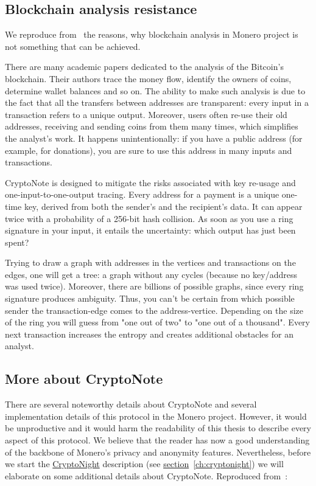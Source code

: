 \subsection{Blockchain analysis resistance}
We reproduce from~\cite{cryptonote} the reasons, why blockchain analysis in Monero project is not something that can be achieved.

There are many academic papers dedicated to the analysis of the Bitcoin's blockchain. Their authors trace the money flow, identify the owners of coins, determine wallet balances and so on. The ability to make such analysis is due to the fact that all the transfers between addresses are transparent: every input in a transaction refers to a unique output. Moreover, users often re-use their old addresses, receiving and sending coins from them many times, which simplifies the analyst's work. It happens unintentionally: if you have a public address (for example, for donations), you are sure to use this address in many inputs and transactions.

CryptoNote is designed to mitigate the risks associated with key re-usage and one-input-to-one-output tracing. Every address for a payment is a unique one-time key, derived from both the sender's and the recipient's data. It can appear twice with a probability of a 256-bit hash collision. As soon as you use a ring signature in your input, it entails the uncertainty: which output has just been spent?

Trying to draw a graph with addresses in the vertices and transactions on the edges, one will get a tree: a graph without any cycles (because no key/address was used twice). Moreover, there are billions of possible graphs, since every ring signature produces ambiguity. Thus, you can't be certain from which possible sender the transaction-edge comes to the address-vertice. Depending on the size of the ring you will guess from "one out of two" to "one out of a thousand". Every next transaction increases the entropy and creates additional obstacles for an analyst.

\subsection{More about CryptoNote}
There are several noteworthy details about CryptoNote and several implementation details of this protocol in the Monero project. However, it would be unproductive and it would harm the readability of this thesis to describe every aspect of this protocol. We believe that the reader has now a good understanding of the backbone of Monero's privacy and anonymity features. Nevertheless, before we start the \hyperref[ch:cryptonight]{CryptoNight} description (see \hyperref[ch:cryptonight]{section}~\ref{ch:cryptonight}) we will elaborate on some additional details about CryptoNote. Reproduced from~\cite{cryptonote}:

